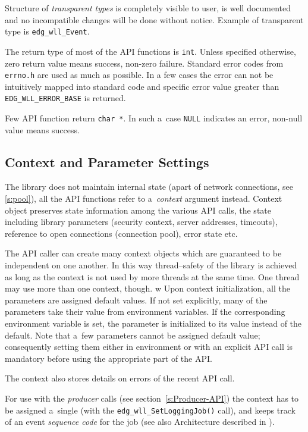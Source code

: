 Structure of \textit{transparent types} is completely visible to
user, is well documented and no incompatible changes will be done
without notice. Example of transparent type is
\verb'edg_wll_Event'.

%
The return type of most of the API functions is \verb'int'.
Unless specified otherwise, zero return value means success, non-zero
failure. Standard error codes from \verb'errno.h' are used as
much as possible. In a few cases the error can not be intuitively
mapped into standard code and \LB specific error value greater than
\verb'EDG_WLL_ERROR_BASE' is returned.

Few API function return \verb'char *'. In such a~case
\verb'NULL' indicates an error, non-null value means success.

\subsection{Context and Parameter Settings}
\label{s:context}

The \LB library does not maintain internal state (apart of network
connections, see \ref{s:pool}), all the API
functions refer to a~\emph{context} argument instead.
Context object preserves state information among the various API
calls, the state including \LB library parameters (\eg security
context, server addresses, timeouts), reference to open connections
(connection pool), error state etc.

The API caller can create many context objects which are guaranteed
to be independent on one another. In this way thread--safety of the
library is achieved as long as the context is not used by more threads
at the same time. One thread may use more than one context, though.
w 
Upon context initialization, all the parameters are assigned default
values. If not set explicitly, many of the parameters take their
value from environment variables. If the corresponding environment
variable is set, the parameter is initialized to its value instead of
the default. Note that a~few parameters cannot be assigned default
value; consequently setting them either in environment or with an
explicit API call is mandatory before using the appropriate part of
the API.

The context also stores details on errors of the recent API call.

For use with the \emph{producer} calls (see section~\ref{s:Producer-API})
the context has to be assigned a~single \jobid (with the
\verb'edg_wll_SetLoggingJob()' call), and keeps track of an event
\emph{sequence code} for the job (see also \LB Architecture described in \cite{lbug}).

